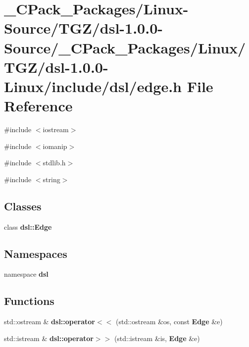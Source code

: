 \section{\_\-CPack\_\-Packages/Linux-\/Source/TGZ/dsl-\/1.0.0-\/Source/\_\-CPack\_\-Packages/Linux/TGZ/dsl-\/1.0.0-\/Linux/include/dsl/edge.h File Reference}
\label{__CPack__Packages_2Linux-Source_2TGZ_2dsl-1_80_80-Source_2__CPack__Packages_2Linux_2TGZ_2dsl-1_8f95b43f8acc11c1c47ed913f3314f6f6}
{\ttfamily \#include $<$iostream$>$}\par
{\ttfamily \#include $<$iomanip$>$}\par
{\ttfamily \#include $<$stdlib.h$>$}\par
{\ttfamily \#include $<$string$>$}\par
\subsection*{Classes}
\begin{DoxyCompactItemize}
\item 
class {\bf dsl::Edge}
\end{DoxyCompactItemize}
\subsection*{Namespaces}
\begin{DoxyCompactItemize}
\item 
namespace {\bf dsl}
\end{DoxyCompactItemize}
\subsection*{Functions}
\begin{DoxyCompactItemize}
\item 
std::ostream \& {\bf dsl::operator$<$$<$} (std::ostream \&os, const {\bf Edge} \&e)
\item 
std::istream \& {\bf dsl::operator$>$$>$} (std::istream \&is, {\bf Edge} \&e)
\end{DoxyCompactItemize}
